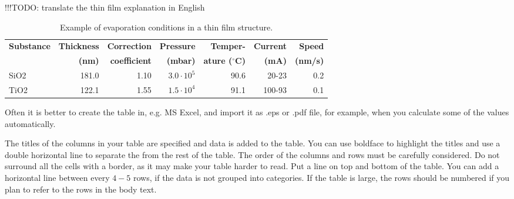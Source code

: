 \documentclass[12pt,a4paper,finnish]{tutthesis}
\newcommand\todo[1]{{\color{red}!!!TODO: #1}} %
\begin{document}
\todo{translate the thin film explanation in English}

\begin{table}[ht]
  \small
  \begin{center}
    \caption{Example of evaporation conditions in a thin film structure.}
    \label{tab:thin_film}
    \begin{tabular}{l | r r r r r r}
      \hline
      \textbf{Substance} & \textbf{Thickness}& \textbf{Correction } & \textbf{Pressure} & \textbf{Temper-}          & \textbf{Current} & \textbf{Speed} \\
                         & \textbf{(nm)}     & \textbf{coefficient} & \textbf{(mbar)}   & \textbf{ature ($^\circ$C)} & \textbf{(mA)}    & \textbf{(nm/s)} \\
      \hline 
      \hline
      SiO2	& 181.0	& 1.10	& $3.0\cdot10^5$	& 90.6	& 20-23	 &0.2 \\
      TiO2	& 122.1	& 1.55	& $1.5\cdot10^4$	& 91.1	& 100-93 &0.1 \\
      \hline
    \end{tabular}
  \end{center}
\end{table}


Often it is better to create the table in, e.g. MS Excel, and import
it as .eps or .pdf file, for example, when you calculate some of the
values automatically.



The titles of the columns in your table are specified and data is
added to the table. You can use boldface to highlight the titles and
use a double horizontal line to separate the from the rest of the
table. The order of the columns and rows must be carefully
considered. Do not surround all the cells with a border, as it may
make your table harder to read. Put a line on top and bottom of the
table. You can add a horizontal line between every $4-5$ rows, if the
data is not grouped into categories. If the table is large, the rows
should be numbered if you plan to refer to the rows in the body text.
\end{document}
